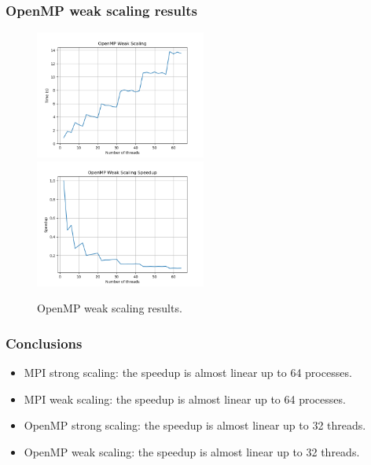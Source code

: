 \documentclass{beamer}
\begin{document}
\begin{frame}
    \frametitle{OpenMP weak scaling results}
    \begin{figure}
        \centering
        \includegraphics[width=0.5\textwidth]{../images/omp_weak_scaling.png}
        \includegraphics[width=0.5\textwidth]{../images/omp_weak_scaling_speedup.png}
        \caption{OpenMP weak scaling results.}
    \end{figure}
\end{frame}

\begin{frame}
    \frametitle{Conclusions}
    \begin{itemize}
        \item MPI strong scaling: the speedup is almost linear up to 64 processes.
        \item MPI weak scaling: the speedup is almost linear up to 64 processes.
        \item OpenMP strong scaling: the speedup is almost linear up to 32 threads.
        \item OpenMP weak scaling: the speedup is almost linear up to 32 threads.
    \end{itemize}
\end{frame}
\end{document}
